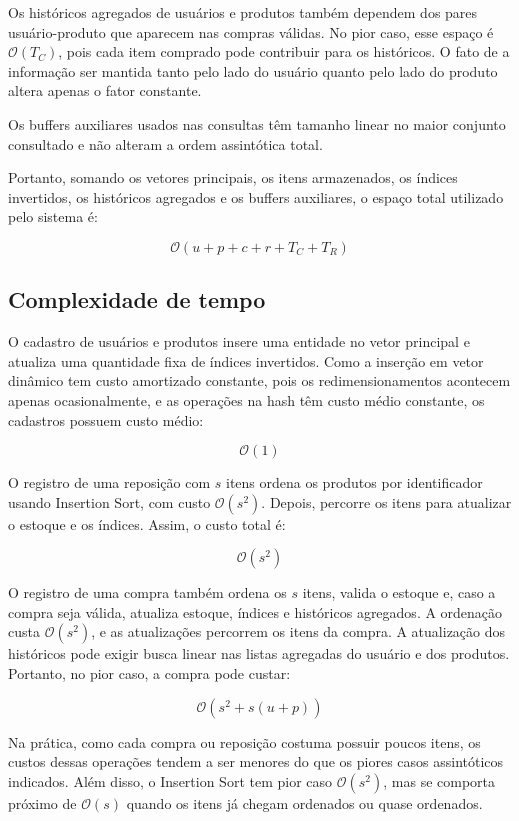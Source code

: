\documentclass[11pt,a4paper]{article}
\begin{document}
Os históricos agregados de usuários e produtos também dependem dos pares usuário-produto que aparecem nas compras válidas. No pior caso, esse espaço é \(\mathcal{O}(T_C)\), pois cada item comprado pode contribuir para os históricos. O fato de a informação ser mantida tanto pelo lado do usuário quanto pelo lado do produto altera apenas o fator constante.

Os buffers auxiliares usados nas consultas têm tamanho linear no maior conjunto consultado e não alteram a ordem assintótica total.

Portanto, somando os vetores principais, os itens armazenados, os índices invertidos, os históricos agregados e os buffers auxiliares, o espaço total utilizado pelo sistema é:

\[
\mathcal{O}(u + p + c + r + T_C + T_R)
\]

\subsection{Complexidade de tempo}

O cadastro de usuários e produtos insere uma entidade no vetor principal e atualiza uma quantidade fixa de índices invertidos. Como a inserção em vetor dinâmico tem custo amortizado constante, pois os redimensionamentos acontecem apenas ocasionalmente, e as operações na hash têm custo médio constante, os cadastros possuem custo médio:

\[
\mathcal{O}(1)
\]

O registro de uma reposição com \(s\) itens ordena os produtos por identificador usando Insertion Sort, com custo \(\mathcal{O}(s^2)\). Depois, percorre os itens para atualizar o estoque e os índices. Assim, o custo total é:

\[
\mathcal{O}(s^2)
\]

O registro de uma compra também ordena os \(s\) itens, valida o estoque e, caso a compra seja válida, atualiza estoque, índices e históricos agregados. A ordenação custa \(\mathcal{O}(s^2)\), e as atualizações percorrem os itens da compra. A atualização dos históricos pode exigir busca linear nas listas agregadas do usuário e dos produtos. Portanto, no pior caso, a compra pode custar:

\[
\mathcal{O}(s^2 + s(u+p))
\]

Na prática, como cada compra ou reposição costuma possuir poucos itens, os custos dessas operações tendem a ser menores do que os piores casos assintóticos indicados. Além disso, o Insertion Sort tem pior caso \(\mathcal{O}(s^2)\), mas se comporta próximo de \(\mathcal{O}(s)\) quando os itens já chegam ordenados ou quase ordenados.
\end{document}

